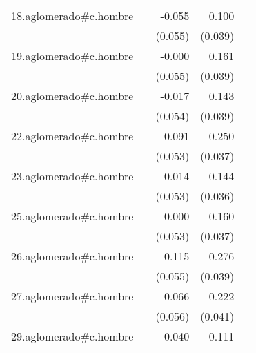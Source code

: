 {\begin{longtable}{l*{4}{D{.}{.}{-1}}}
\addlinespace
18.aglomerado#c.hombre&                     &      -0.055         &       0.100\sym{*}  &                     \\
            &                     &     (0.055)         &     (0.039)         &                     \\
\addlinespace
19.aglomerado#c.hombre&                     &      -0.000         &       0.161\sym{***}&                     \\
            &                     &     (0.055)         &     (0.039)         &                     \\
\addlinespace
20.aglomerado#c.hombre&                     &      -0.017         &       0.143\sym{***}&                     \\
            &                     &     (0.054)         &     (0.039)         &                     \\
\addlinespace
22.aglomerado#c.hombre&                     &       0.091         &       0.250\sym{***}&                     \\
            &                     &     (0.053)         &     (0.037)         &                     \\
\addlinespace
23.aglomerado#c.hombre&                     &      -0.014         &       0.144\sym{***}&                     \\
            &                     &     (0.053)         &     (0.036)         &                     \\
\addlinespace
25.aglomerado#c.hombre&                     &      -0.000         &       0.160\sym{***}&                     \\
            &                     &     (0.053)         &     (0.037)         &                     \\
\addlinespace
26.aglomerado#c.hombre&                     &       0.115\sym{*}  &       0.276\sym{***}&                     \\
            &                     &     (0.055)         &     (0.039)         &                     \\
\addlinespace
27.aglomerado#c.hombre&                     &       0.066         &       0.222\sym{***}&                     \\
            &                     &     (0.056)         &     (0.041)         &                     \\
\addlinespace
29.aglomerado#c.hombre&                     &      -0.040         &       0.111\sym{***}&                     \\

\end{longtable}}
